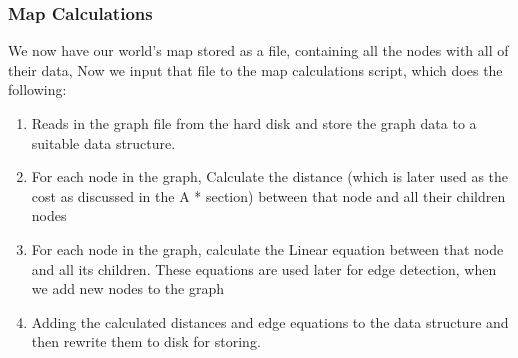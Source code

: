 \subsubsection{Map Calculations}
We now have our world's map stored as a file, containing all the nodes with all of their data, Now we input that file to the map calculations script, which does the following:
\begin{enumerate}
    \item Reads in the graph file from the hard disk and store the graph data to a suitable data structure.
    \item For each node in the graph, Calculate the distance (which is later used as the cost as discussed in the A * section) between that node and all their children nodes
    \item For each node in the graph, calculate the Linear equation between that node and all its children. These equations are used later for edge detection, when we add new nodes to the graph
    \item Adding the calculated distances and edge equations to the data structure and then rewrite them to disk for storing.
\end{enumerate}
